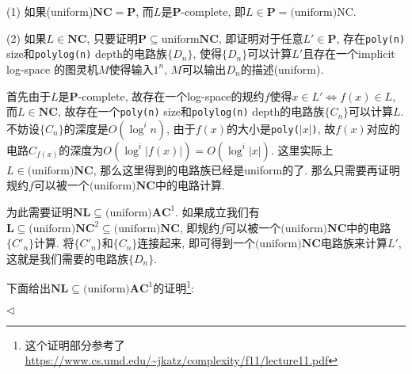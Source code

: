 \documentclass[11pt]{article}
\newcommand{\mP}{\mathbf{P}}
\newcommand{\mPC}{\mathbf{P}\text{-complete}}
\newcommand{\LL}{\mathbf{L}}
\newcommand{\NL}{ \mathbf{NL}}
\newcommand{\NC}{\mathbf{NC}}
\newcommand{\AC}{\mathbf{AC}}
\newcommand{\1}{\mathbf{1}}
\newenvironment{answer}[1][Solution]{\begin{trivlist}
\item[\hskip \labelsep{\bfseries#1.}\hskip \labelsep]}{\hfill$\lhd$\end{trivlist}}
\begin{document}
\begin{answer}
    (1) 如果(uniform)$\NC = \mP$, 而$L$是$\mPC$, 即$L \in \mP = \text{(uniform)NC}$.

    (2) 如果$L \in \NC$, 只要证明$\mP \subseteq \text{uniform} \NC$, 即证明对于任意$L' \in \mP$, 存在\texttt{poly(n)} size和\texttt{polylog(n)} depth的电路族$\{D_n\}$, 使得$\{D_n\}$可以计算$L'$且存在一个implicit log-space 的图灵机$M$使得输入$1^n$, $M$可以输出$D_n$的描述(uniform).

    首先由于$L$是$\mPC$, 故存在一个log-space的规约$f$使得$x\in L' \iff f(x) \in L$, 而$L\in\NC$, 故存在一个\texttt{poly(n)} size和\texttt{polylog(n)} depth的电路族$\{C_n\}$可以计算$L$. 不妨设$\{C_n\}$的深度是$O(\log^i n)$, 由于$f(x)$的大小是\texttt{poly($|x|$)}, 故$f(x)$对应的电路$C_{f(x)}$的深度为$O(\log^i |f(x)|) = O(\log^i |x|)$.  这里实际上$L \in \text{(uniform)}\NC$, 那么这里得到的电路族已经是uniform的了. 那么只需要再证明规约$f$可以被一个$\text{(uniform)}\NC$中的电路计算.
    
    为此需要证明$\NL \subseteq \text{(uniform)}\AC^1$. 如果成立我们有$\LL \subseteq \text{(uniform)}\NC^2 \subseteq \text{(uniform)}\NC$, 即规约$f$可以被一个$\text{(uniform)}\NC$中的电路$\{C'_n\}$计算. 将$\{C'_n\}$和$\{C_n\}$连接起来, 即可得到一个$\text{(uniform)}\NC$电路族来计算$L'$, 这就是我们需要的电路族$\{D_n\}$.

    下面给出$\NL \subseteq \text{(uniform)}\AC^1$的证明\footnote{这个证明部分参考了\url{https://www.cs.umd.edu/~jkatz/complexity/f11/lecture11.pdf}}:


\end{answer}
\end{document}
